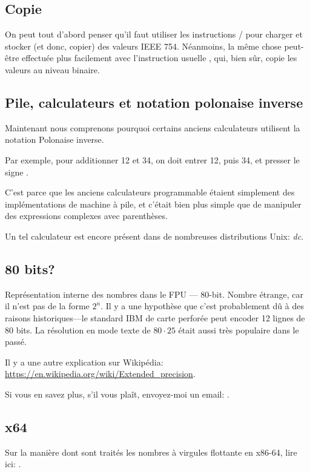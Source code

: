 \subsection{Copie}

On peut tout d'abord penser qu'il faut utiliser les instructions /
pour charger et stocker (et donc, copier) des valeurs IEEE 754.
Néanmoins, la même chose peut-être effectuée plus facilement avec l'instruction usuelle
, qui, bien sûr, copie les valeurs au niveau binaire.

\subsection{Pile, calculateurs et notation polonaise inverse}


Maintenant nous comprenons pourquoi certains anciens calculateurs utilisent la notation
Polonaise inverse.

Par exemple, pour additionner 12 et 34, on doit entrer 12, puis 34, et presser le
signe .

C'est parce que les anciens calculateurs programmable étaient simplement des implémentations
de machine à pile, et c'était bien plus simple que de manipuler des expressions
complexes avec parenthèses.

Un tel calculateur est encore présent dans de nombreuses distributions Unix: \emph{dc}.

\subsection{80 bits?}


Représentation interne des nombres dans le FPU --- 80-bit.
Nombre étrange, car il n'est pas de la forme $2^n$.
Il y a une hypothèse que c'est probablement dû à des raisons historiques---le standard
IBM de carte perforée peut encoder 12 lignes de 80 bits.
La résolution en mode texte de $80\cdot 25$ était aussi très populaire dans le passé.

Il y a une autre explication sur Wikipédia: \url{https://en.wikipedia.org/wiki/Extended_precision}.

Si vous en savez plus, s'il vous plaît, envoyez-moi un email: \EMAILS{}.

\subsection{x64}

Sur la manière dont sont traités les nombres à virgules flottante en x86-64, lire
ici: .



